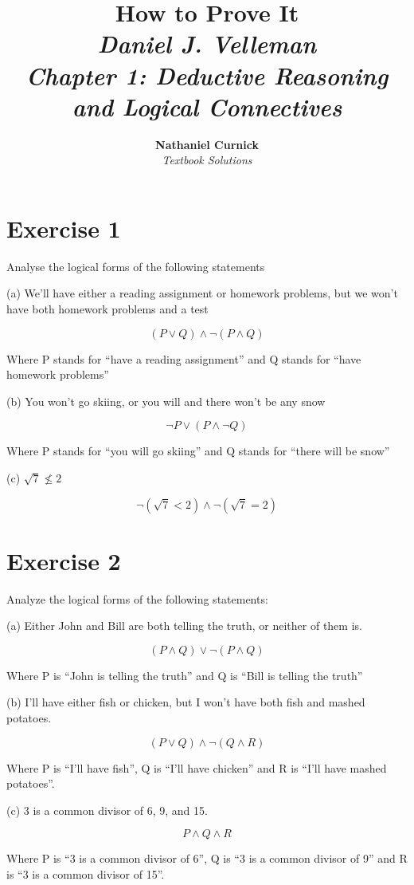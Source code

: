 \documentclass[11pt]{article}
\title{\textbf{How to Prove It} \\ {\Large\itshape Daniel J. Velleman} \\ {\Large\itshape Chapter 1: Deductive Reasoning and Logical Connectives}}
\author{\textbf{Nathaniel Curnick} \\ \textit{Textbook Solutions}}
\date{}
\begin{document}
\maketitle

\section*{Exercise 1}

Analyse the logical forms of the following statements

\noindent (a) We'll have either a reading assignment or homework problems, but we won't have both homework problems and a test

$$ (P \vee Q) \wedge \neg (P \wedge Q)$$

Where P stands for ``have a reading assignment'' and Q stands for ``have homework problems''

\noindent (b) You won't go skiing, or you will and there won't be any snow

$$\neg P \vee (P \wedge \neg Q)$$

Where P stands for ``you will go skiing'' and Q stands for ``there will be snow''

\noindent (c) $\sqrt{7} \nleq 2 $

$$\neg (\sqrt{7} < 2) \wedge \neg (\sqrt{7} = 2)$$

\section*{Exercise 2}

Analyze the logical forms of the following statements:

\noindent (a) Either John and Bill are both telling the truth, or neither of them is.

$$ (P \wedge Q) \vee \neg (P \wedge Q) $$

Where P is ``John is telling the truth'' and Q is ``Bill is telling the truth''

\noindent (b) I'll have either fish or chicken, but I won't have both fish and mashed potatoes.

$$ (P \vee Q ) \wedge \neg (Q \wedge R) $$

Where P is ``I'll have fish'', Q is ``I'll have chicken'' and R is ``I'll have mashed potatoes''.

\noindent (c) 3 is a common divisor of 6, 9, and 15.

$$ P \wedge Q \wedge R $$

Where P is ``3 is a common divisor of 6'', Q is ``3 is a common divisor of 9'' and R is ``3 is a common divisor of 15''.
\end{document}
